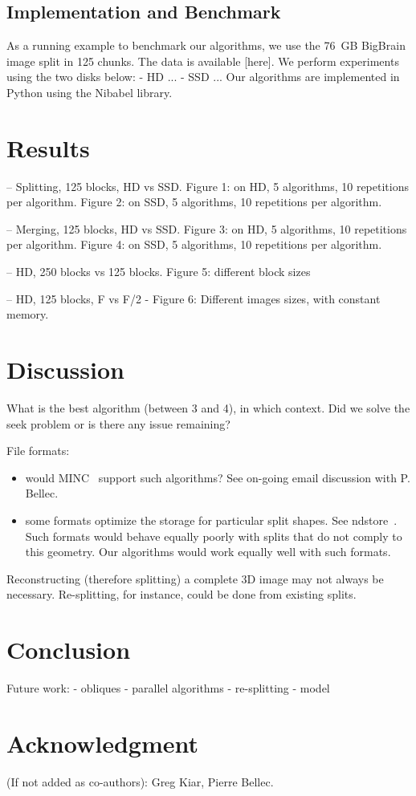 \documentclass[10pt, conference, compsocconf]{IEEEtran}
\begin{document}
\subsection{Implementation and Benchmark}



As a running example to benchmark our algorithms, we use the 76~GB
BigBrain image split in 125 chunks. The data is available [here]. We
perform experiments using the two disks below:
- HD ...
- SSD ...
Our algorithms are implemented in Python using the Nibabel library. 

\section{Results}

-- Splitting, 125 blocks, HD vs SSD.
Figure 1: on HD, 5 algorithms, 10 repetitions per algorithm.
Figure 2: on SSD, 5 algorithms, 10 repetitions per algorithm. 

-- Merging, 125 blocks, HD vs SSD.
Figure 3: on HD, 5 algorithms, 10 repetitions per algorithm.
Figure 4: on SSD, 5 algorithms, 10 repetitions per algorithm. 

-- HD, 250 blocks vs 125 blocks. 
Figure 5: different block sizes

-- HD, 125 blocks, F vs F/2
- Figure 6: Different images sizes, with constant memory.

\section{Discussion}

What is the best algorithm (between 3 and 4), in which context. Did we
solve the seek problem or is there any issue remaining?

File formats:
\begin{itemize}
\item would MINC~\cite{vincent2016minc} support such algorithms? See on-going email discussion
with P. Bellec.
\item some formats optimize the storage for particular split shapes. See
  ndstore~\cite{burns2013open}. Such formats would behave equally
  poorly with splits that do not comply to this geometry. Our
  algorithms would work equally well with such formats.
\end{itemize}

Reconstructing (therefore splitting) a complete 3D image may not
always be necessary. Re-splitting, for instance, could be done from
existing splits.

\section{Conclusion}

Future work:
- obliques
- parallel algorithms
- re-splitting
- model

\section*{Acknowledgment}

(If not added as co-authors): Greg Kiar, Pierre Bellec.



\end{document}
